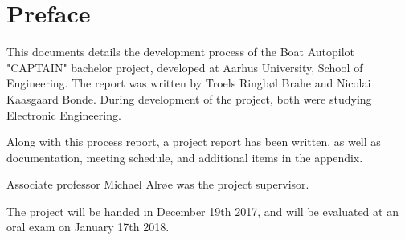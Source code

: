 \chapter{Preface}
This documents details the development process of the Boat Autopilot "CAPTAIN" bachelor project, developed at Aarhus University, School of Engineering. The report was written by Troels Ringbøl Brahe and Nicolai Kaasgaard Bonde. During development of the project, both were studying Electronic Engineering.

Along with this process report, a project report has been written, as well as documentation, meeting schedule, and additional items in the appendix.

Associate professor Michael Alrøe was the project supervisor.

The project will be handed in December 19th 2017, and will be evaluated at an oral exam on January 17th 2018.